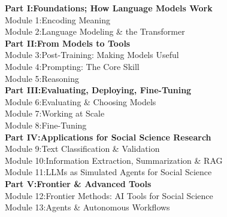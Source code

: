 \documentclass[11pt, a4paper]{article}
\begin{document}
{\sffamily
\textbf{\textcolor{accent}{Part I:}\;\;\textcolor{dark}{Foundations; How Language Models Work}}\\[0.2em]
\hspace{1.5em}Module 1:\;\;Encoding Meaning\\
\hspace{1.5em}Module 2:\;\;Language Modeling \& the Transformer\\[0.6em]

\textbf{\textcolor{accent}{Part II:}\;\;\textcolor{dark}{From Models to Tools}}\\[0.2em]
\hspace{1.5em}Module 3:\;\;Post-Training: Making Models Useful\\
\hspace{1.5em}Module 4:\;\;Prompting: The Core Skill\\
\hspace{1.5em}Module 5:\;\;Reasoning\\[0.6em]

\textbf{\textcolor{accent}{Part III:}\;\;\textcolor{dark}{Evaluating, Deploying, Fine-Tuning}}\\[0.2em]
\hspace{1.5em}Module 6:\;\;Evaluating \& Choosing Models\\
\hspace{1.5em}Module 7:\;\;Working at Scale\\
\hspace{1.5em}Module 8:\;\;Fine-Tuning\\[0.6em]

\textbf{\textcolor{accent}{Part IV:}\;\;\textcolor{dark}{Applications for Social Science Research}}\\[0.2em]
\hspace{1.5em}Module 9:\;\;Text Classification \& Validation\\
\hspace{1.5em}Module 10:\;\;Information Extraction, Summarization \& RAG\\
\hspace{1.5em}Module 11:\;\;LLMs as Simulated Agents for Social Science\\[0.6em]

\textbf{\textcolor{accent}{Part V:}\;\;\textcolor{dark}{Frontier \& Advanced Tools}}\\[0.2em]
\hspace{1.5em}Module 12:\;\;Frontier Methods: AI Tools for Social Science\\
\hspace{1.5em}Module 13:\;\;Agents \& Autonomous Workflows\\
}
\end{document}
